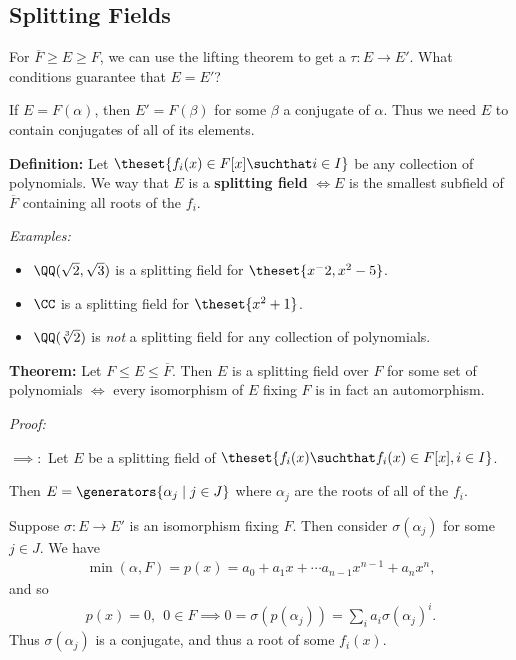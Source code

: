 \hypertarget{splitting-fields}{%
\subsection{Splitting Fields}\label{splitting-fields}}

For \(\overline F \geq E \geq F\), we can use the lifting theorem to get
a \(\tau: E \to E'\). What conditions guarantee that \(E = E'\)?

If \(E = F(\alpha)\), then \(E' = F(\beta)\) for some \(\beta\) a
conjugate of \(\alpha\). Thus we need \(E\) to contain conjugates of all
of its elements.

\textbf{Definition:} Let \(\theset{f_i(x) \in F[x] \suchthat i\in I}\)
be any collection of polynomials. We way that \(E\) is a
\textbf{splitting field} \(\iff E\) is the smallest subfield of
\(\overline F\) containing all roots of the \(f_i\).

\emph{Examples:}

\begin{itemize}
\item
  \(\QQ(\sqrt 2, \sqrt 3)\) is a splitting field for
  \(\theset{x^-2, x^2 - 5}\).
\item
  \(\CC\) is a splitting field for \(\theset{x^2 + 1}\).
\item
  \(\QQ(\sqrt[3] 2)\) is \emph{not} a splitting field for any collection
  of polynomials.
\end{itemize}

\textbf{Theorem:} Let \(F \leq E \leq \overline F\). Then \(E\) is a
splitting field over \(F\) for some set of polynomials \(\iff\) every
isomorphism of \(E\) fixing \(F\) is in fact an automorphism.

\emph{Proof:}

\(\implies:\) Let \(E\) be a splitting field of
\(\theset{f_i(x) \suchthat f_i(x) \in F[x], i\in I}\).

Then \(E = \generators{\alpha_j \mid j\in J}\) where \(\alpha_j\) are
the roots of all of the \(f_i\).

Suppose \(\sigma: E \to E'\) is an isomorphism fixing \(F\). Then
consider \(\sigma(\alpha_j)\) for some \(j \in J\). We have
\begin{align*}
\min(\alpha, F) = p(x) = a_0 + a_1 x + \cdots a_{n-1}x^{n-1} + a_n x^n
,\end{align*} and so
\begin{align*}
p(x) = 0,~~ 0\in F \implies 0 = \sigma(p(\alpha_j)) = \sum_i a_i \sigma(\alpha_j)^i
.\end{align*} Thus \(\sigma(\alpha_j)\) is a conjugate, and thus a root
of some \(f_i(x)\).

